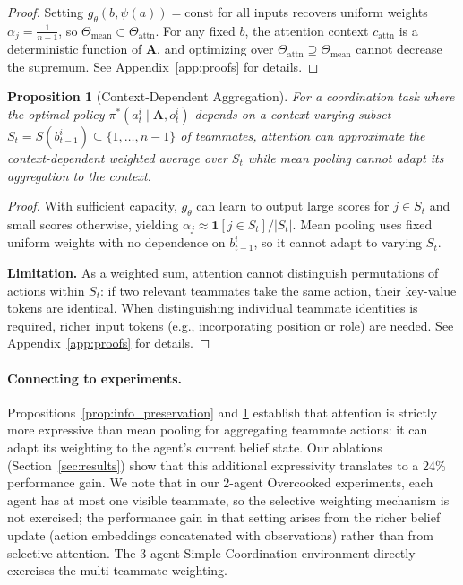 \documentclass{article}
\theoremstyle{plain}
\newtheorem{proposition}[theorem]{Proposition}
\theoremstyle{definition}
\theoremstyle{remark}
\begin{document}
\begin{proof}
Setting $g_\theta(b, \psi(a)) = \mathrm{const}$ for all inputs recovers uniform weights $\alpha_j = \frac{1}{n-1}$, so $\Theta_{\mathrm{mean}} \subset \Theta_{\mathrm{attn}}$. For any fixed $b$, the attention context $c_{\mathrm{attn}}$ is a deterministic function of $\mathbf{A}$, and optimizing over $\Theta_{\mathrm{attn}} \supseteq \Theta_{\mathrm{mean}}$ cannot decrease the supremum. See Appendix~\ref{app:proofs} for details.
\end{proof}

\begin{proposition}[Context-Dependent Aggregation]
\label{prop:sufficient_stat}
For a coordination task where the optimal policy $\pi^*(a_t^i \mid \mathbf{A}, o_t^i)$ depends on a context-varying subset $S_t = S(b_{t-1}^i) \subseteq \{1, \ldots, n-1\}$ of teammates, attention can approximate the context-dependent weighted average over $S_t$ while mean pooling cannot adapt its aggregation to the context.
\end{proposition}

\begin{proof}
With sufficient capacity, $g_\theta$ can learn to output large scores for $j \in S_t$ and small scores otherwise, yielding $\alpha_j \approx \mathbf{1}[j \in S_t] / |S_t|$. Mean pooling uses fixed uniform weights with no dependence on $b_{t-1}^i$, so it cannot adapt to varying $S_t$.

\textbf{Limitation.} As a weighted sum, attention cannot distinguish permutations of actions within $S_t$: if two relevant teammates take the same action, their key-value tokens are identical. When distinguishing individual teammate identities is required, richer input tokens (e.g., incorporating position or role) are needed. See Appendix~\ref{app:proofs} for details.
\end{proof}

\paragraph{Connecting to experiments.}
Propositions~\ref{prop:info_preservation} and \ref{prop:sufficient_stat} establish that attention is strictly more expressive than mean pooling for aggregating teammate actions: it can adapt its weighting to the agent's current belief state. Our ablations (Section~\ref{sec:results}) show that this additional expressivity translates to a 24\% performance gain. We note that in our 2-agent Overcooked experiments, each agent has at most one visible teammate, so the selective weighting mechanism is not exercised; the performance gain in that setting arises from the richer belief update (action embeddings concatenated with observations) rather than from selective attention. The 3-agent Simple Coordination environment directly exercises the multi-teammate weighting.
\end{document}
